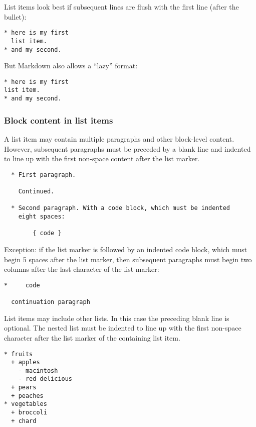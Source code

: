 \documentclass[
]{article}
\begin{document}
List items look best if subsequent lines are flush with the first line
(after the bullet):

\begin{verbatim}
* here is my first
  list item.
* and my second.
\end{verbatim}

But Markdown also allows a ``lazy'' format:

\begin{verbatim}
* here is my first
list item.
* and my second.
\end{verbatim}

\hypertarget{block-content-in-list-items}{%
\subsubsection{Block content in list
items}\label{block-content-in-list-items}}

A list item may contain multiple paragraphs and other block-level
content. However, subsequent paragraphs must be preceded by a blank line
and indented to line up with the first non-space content after the list
marker.

\begin{verbatim}
  * First paragraph.

    Continued.

  * Second paragraph. With a code block, which must be indented
    eight spaces:

        { code }
\end{verbatim}

Exception: if the list marker is followed by an indented code block,
which must begin 5 spaces after the list marker, then subsequent
paragraphs must begin two columns after the last character of the list
marker:

\begin{verbatim}
*     code

  continuation paragraph
\end{verbatim}

List items may include other lists. In this case the preceding blank
line is optional. The nested list must be indented to line up with the
first non-space character after the list marker of the containing list
item.

\begin{verbatim}
* fruits
  + apples
    - macintosh
    - red delicious
  + pears
  + peaches
* vegetables
  + broccoli
  + chard
\end{verbatim}
\end{document}

